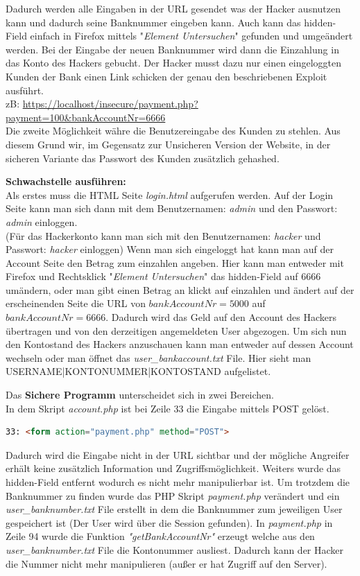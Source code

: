 \documentclass[12pt,a4paper,titlepage,oneside]{scrartcl}
\begin{document}
Dadurch werden alle Eingaben in der URL gesendet was der Hacker ausnutzen kann und dadurch seine
Banknummer eingeben kann.
Auch kann das hidden-Field einfach in Firefox mittels "\textit{Element Untersuchen}" gefunden und umgeändert werden.
Bei der Eingabe der neuen Banknummer wird dann die Einzahlung in das Konto des Hackers gebucht.
Der Hacker musst dazu nur einen eingeloggten Kunden der Bank einen Link schicken der genau den beschriebenen
Exploit ausführt.\\
zB: \url{https://localhost/insecure/payment.php?payment=100&bankAccountNr=6666}\\
Die zweite Möglichkeit währe die Benutzereingabe des Kunden zu stehlen.
Aus diesem Grund wir, im Gegensatz zur Unsicheren Version der Website, in der sicheren Variante das Passwort des Kunden zusätzlich gehashed.

\textbf{Schwachstelle ausführen:}\\
Als erstes muss die HTML Seite \textit{login.html} aufgerufen werden.
Auf der Login Seite kann man sich dann mit dem Benutzernamen: \textit{admin} und den Passwort: \textit{admin} einloggen.\\
(Für das Hackerkonto kann man sich mit den Benutzernamen: \textit{hacker} und Passwort: \textit{hacker} einloggen)
Wenn man sich eingeloggt hat kann man auf der Account Seite den Betrag zum einzahlen angeben.
Hier kann man entweder mit Firefox und Rechtsklick "\textit{Element Untersuchen}" das hidden-Field auf 6666 umändern, oder man gibt einen Betrag an klickt auf einzahlen und ändert auf der erscheinenden Seite die URL von $bankAccountNr=5000$ auf $bankAccountNr=6666$.
Dadurch wird das Geld auf den Account des Hackers übertragen und von den derzeitigen angemeldeten User abgezogen. Um sich nun den Kontostand des Hackers anzuschauen kann man entweder auf dessen Account wechseln oder man öffnet das \textit{user\_bankaccount.txt} File. Hier sieht man USERNAME|KONTONUMMER|KONTOSTAND aufgelistet.

Das \textbf{Sichere Programm} unterscheidet sich in zwei Bereichen.\\
In dem Skript \textit{account.php} ist bei Zeile 33 die Eingabe mittels POST gelöst.\\
\begin{lstlisting}[caption=HTML,language=HTML]
33: <form action="payment.php" method="POST">
\end{lstlisting}
Dadurch wird die Eingabe nicht in der URL sichtbar und der mögliche Angreifer erhält keine zusätzlich
Information und Zugriffsmöglichkeit.
Weiters wurde das hidden-Field entfernt wodurch es nicht mehr manipulierbar ist. Um trotzdem die Banknummer
zu finden wurde das PHP Skript \textit{payment.php} verändert und ein \textit{user\_banknumber.txt} File erstellt in dem die Banknummer
zum jeweiligen User gespeichert ist (Der User wird über die Session gefunden).
In \textit{payment.php} in Zeile 94 wurde die Funktion \textit{"getBankAccountNr"} erzeugt welche aus den \textit{user\_banknumber.txt} File die Kontonummer ausliest. Dadurch kann der Hacker die Nummer nicht mehr manipulieren (außer er hat Zugriff auf den Server).
\end{document}
